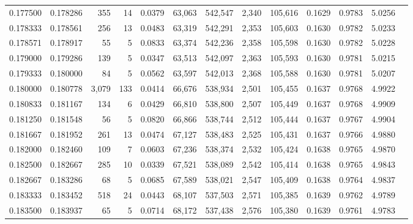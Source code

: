 \begin{tabular}{rrrrrrrrrrrrr}
0.177500 & 0.178286 &   355 &  14 &                                     0.0379 &  63,063 & 542,547 &   2,340 & 105,616 & 0.1629 & 0.9783 & 5.0256 \\
0.178333 & 0.178561 &   256 &  13 &                                     0.0483 &  63,319 & 542,291 &   2,353 & 105,603 & 0.1630 & 0.9782 & 5.0233 \\
0.178571 & 0.178917 &    55 &   5 &                                     0.0833 &  63,374 & 542,236 &   2,358 & 105,598 & 0.1630 & 0.9782 & 5.0228 \\
0.179000 & 0.179286 &   139 &   5 &                                     0.0347 &  63,513 & 542,097 &   2,363 & 105,593 & 0.1630 & 0.9781 & 5.0215 \\
0.179333 & 0.180000 &    84 &   5 &                                     0.0562 &  63,597 & 542,013 &   2,368 & 105,588 & 0.1630 & 0.9781 & 5.0207 \\
0.180000 & 0.180778 & 3,079 & 133 &                                     0.0414 &  66,676 & 538,934 &   2,501 & 105,455 & 0.1637 & 0.9768 & 4.9922 \\
0.180833 & 0.181167 &   134 &   6 &                                     0.0429 &  66,810 & 538,800 &   2,507 & 105,449 & 0.1637 & 0.9768 & 4.9909 \\
0.181250 & 0.181548 &    56 &   5 &                                     0.0820 &  66,866 & 538,744 &   2,512 & 105,444 & 0.1637 & 0.9767 & 4.9904 \\
0.181667 & 0.181952 &   261 &  13 &                                     0.0474 &  67,127 & 538,483 &   2,525 & 105,431 & 0.1637 & 0.9766 & 4.9880 \\
0.182000 & 0.182460 &   109 &   7 &                                     0.0603 &  67,236 & 538,374 &   2,532 & 105,424 & 0.1638 & 0.9765 & 4.9870 \\
0.182500 & 0.182667 &   285 &  10 &                                     0.0339 &  67,521 & 538,089 &   2,542 & 105,414 & 0.1638 & 0.9765 & 4.9843 \\
0.182667 & 0.183286 &    68 &   5 &                                     0.0685 &  67,589 & 538,021 &   2,547 & 105,409 & 0.1638 & 0.9764 & 4.9837 \\
0.183333 & 0.183452 &   518 &  24 &                                     0.0443 &  68,107 & 537,503 &   2,571 & 105,385 & 0.1639 & 0.9762 & 4.9789 \\
0.183500 & 0.183937 &    65 &   5 &                                     0.0714 &  68,172 & 537,438 &   2,576 & 105,380 & 0.1639 & 0.9761 & 4.9783 \\

\end{tabular}
